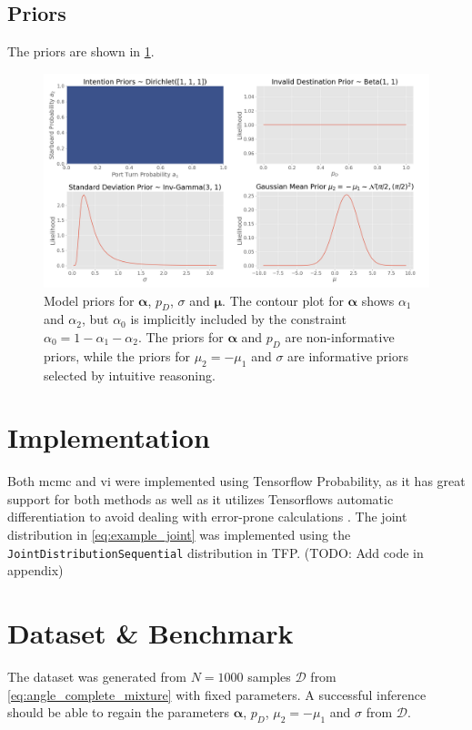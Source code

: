 \subsection{Priors}
The priors are shown in \cref{fig:priors}.
\begin{figure}
    \centering
    \includegraphics[width=1\textwidth]{figures/priors.png}
    \caption{Model priors for $\boldsymbol{\alpha}$, $p_D$, $\sigma$ and $\boldsymbol{\mu}$. The contour plot for $\boldsymbol{\alpha}$ shows $\alpha_1$ and $\alpha_2$, but $\alpha_0$ is implicitly included by the constraint $\alpha_0 = 1 - \alpha_1 - \alpha_2$. The priors for $\boldsymbol{\alpha}$ and $p_D$ are non-informative priors, while the priors for $\mu_2 = -\mu_1$ and $\sigma$ are informative priors selected by intuitive reasoning.}
    \label{fig:priors}
\end{figure}

\section{Implementation}
Both \acrshort{mcmc} and \acrshort{vi} were implemented using Tensorflow Probability, as it has great support for both methods as well as it utilizes Tensorflows automatic differentiation to avoid dealing with error-prone calculations \cite{tensorflow2015-whitepaper}. The joint distribution in \cref{eq:example_joint} was implemented using the \texttt{JointDistributionSequential} distribution in TFP. (TODO: Add code in appendix)


\section{Dataset \& Benchmark}
The dataset was generated from $N=1000$ samples $\boldsymbol{\mathcal{D}}$ from \cref{eq:angle_complete_mixture} with fixed parameters. A successful inference should be able to regain the parameters $\boldsymbol{\alpha}$, $p_D$, $\mu_2 = -\mu_1$ and $\sigma$ from $\mathcal{D}$.


